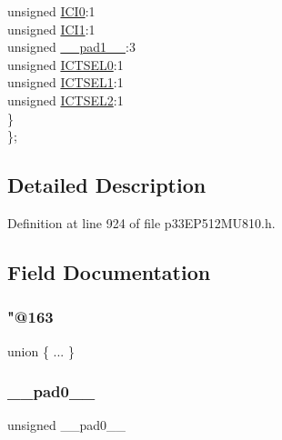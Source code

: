 \begin{DoxyCompactItemize}
\begin{tabbing}
\>\>unsigned \hyperlink{structtag_i_c8_c_o_n1_b_i_t_s_a6f1b5da2706b7c15fc8c9a01a30deaff}{ICI0}:1\\
\>\>unsigned \hyperlink{structtag_i_c8_c_o_n1_b_i_t_s_a7d5c777f0bc43f66f40462f79ed2179c}{ICI1}:1\\
\>\>unsigned \hyperlink{structtag_i_c8_c_o_n1_b_i_t_s_acaf2d0924a107ec6e8d2e31febaf66f9}{\_\_pad1\_\_}:3\\
\>\>unsigned \hyperlink{structtag_i_c8_c_o_n1_b_i_t_s_af6dd4d0e816b18462680d4b22fa926d3}{ICTSEL0}:1\\
\>\>unsigned \hyperlink{structtag_i_c8_c_o_n1_b_i_t_s_aa29140e739d886362537f87d199c4134}{ICTSEL1}:1\\
\>\>unsigned \hyperlink{structtag_i_c8_c_o_n1_b_i_t_s_a47d80892d449e6edbd5ba2ba9ff06deb}{ICTSEL2}:1\\
\>\} \\
\}; \\

\end{tabbing}\end{DoxyCompactItemize}


\subsection{Detailed Description}


Definition at line 924 of file p33\+E\+P512\+M\+U810.\+h.



\subsection{Field Documentation}
\mbox{\label{structtag_i_c8_c_o_n1_b_i_t_s_ad41d301ffbf8b1d7c3cfe97c7fafabdb}} 
\subsubsection{\texorpdfstring{"@163}{@163}}
{\footnotesize\ttfamily union \{ ... \} }

\mbox{\label{structtag_i_c8_c_o_n1_b_i_t_s_adf71f3d8410c1f1dbbc96680a92c49af}} 
\subsubsection{\texorpdfstring{\+\_\+\+\_\+pad0\+\_\+\+\_\+}{\_\_pad0\_\_}}
{\footnotesize\ttfamily unsigned \+\_\+\+\_\+pad0\+\_\+\+\_\+}



